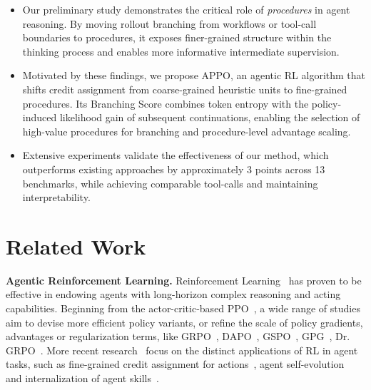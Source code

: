 \documentclass{article}
\begin{document}
\vspace{-0.2cm}
\begin{itemize}[leftmargin=*] 
    \item Our preliminary study demonstrates the critical role of \textit{procedures} in agent reasoning. By moving rollout branching from workflows or tool-call boundaries to procedures, it exposes finer-grained structure within the thinking process and enables more informative intermediate supervision.
    \vspace{-0.1cm}
    \item Motivated by these findings, we propose APPO, an agentic RL algorithm that shifts credit assignment from coarse-grained heuristic units to fine-grained procedures. Its Branching Score combines token entropy with the policy-induced likelihood gain of subsequent continuations, enabling the selection of high-value procedures for branching and procedure-level advantage scaling.
    
    \item Extensive experiments validate the effectiveness of our method, which outperforms existing approaches by approximately 3 points across 13 benchmarks, while achieving comparable tool-calls and maintaining interpretability.
\end{itemize}

\section{Related Work}
\noindent\textbf{Agentic Reinforcement Learning.} Reinforcement Learning~\cite{kaufmann2023survey,schulman2017proximal,rafailov2023direct,guo2025deepseek} has proven to be effective in endowing agents with long-horizon complex reasoning and acting capabilities.  Beginning from the actor-critic-based PPO~\cite{schulman2017proximal}, a wide range of studies aim to devise more efficient policy variants, or refine the scale of policy gradients, advantages or regularization terms, like GRPO~\cite{guo2025deepseek}, DAPO~\cite{yu2025dapo}, GSPO~\cite{zheng2025group}, GPG~\cite{chu2026gpg}, Dr. GRPO~\cite{liu2025understanding}. More recent research~\cite{feng2025group,zhai2025agentevolver,lu2026skill0}  focus on the distinct applications of RL in agent tasks, such as fine-grained credit assignment for actions~\cite{feng2025group,dong2025agentic,dong2025agentic1}, agent self-evolution~\cite{wu2025evolver,zhai2025agentevolver,xia2026skillrl} and internalization of agent skills~\cite{lu2026skill0,zhang2026memskill}.
\end{document}
